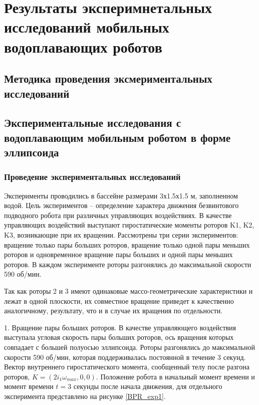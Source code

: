 \chapter{Результаты эксперимнетальных исследований мобильных водоплавающих роботов}\label{ch:ch4}

\section{Методика проведения эксмериментальных исследований}\label{sec:ch4/sec1}

\section{Экспериментальные исследования с водоплавающим мобильным роботом в форме эллипсоида}\label{sec:ch4/sec2}

\subsection{Проведение экспериментальных исследований}\label{subsec:ch4/sec2/sub1}

Эксперименты проводились в бассейне размерами 3х1.5х1.5 м, заполненном водой. Цель экспериментов -- определение характера движения безвинтового подводного робота при различных управляющих воздействиях. В качестве управляющих воздействий выступают гиростатические моменты роторов K1, K2, K3, возникающие при их вращении. Рассмотрены три серии экспериментов: вращение только пары больших роторов, вращение только одной пары меньших роторов и одновременное вращение пары больших и одной пары меньших роторов. В каждом эксперименте роторы разгонялись до максимальной скорости 590 об/мин.

Так как роторы 2 и 3 имеют одинаковые массо-геометрические характеристики и лежат в одной плоскости, их совместное вращение приведет к качественно аналогичному, результату, что и в случае их вращения по отдельности.


1.	Вращение пары больших роторов. В качестве управляющего воздействия выступала угловая скорость пары больших роторов, ось вращения которых совпадает с большей полуосью эллипсоида. Роторы разгонялись до максимальной скорости 590 об/мин, которая поддерживалась постоянной в течение 3 секунд. Вектор внутреннего гиростатического момента, сообщенный телу после разгона роторов, $K = (2i_1\omega_{max}, 0, 0)$. Положение робота в начальный момент времени и момент времени $t=3$ секунды после начала движения, для отдельного эксперимента представлено на рисунке \ref{BPR_exp1}.

